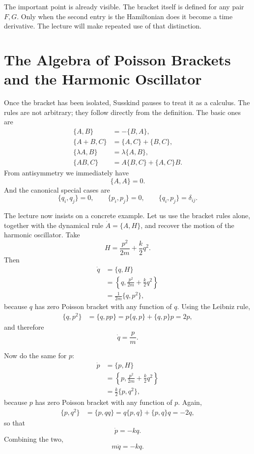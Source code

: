 The important point is already visible. The bracket itself is defined for any pair \(F,G\). Only when the second entry is the Hamiltonian does it become a time derivative. The lecture will make repeated use of that distinction.

\section{The Algebra of Poisson Brackets and the Harmonic Oscillator}

Once the bracket has been isolated, Susskind pauses to treat it as a calculus. The rules are not arbitrary; they follow directly from the definition. The basic ones are
\begin{align}
\{A,B\}&=-\{B,A\},\\
\{A+B,C\}&=\{A,C\}+\{B,C\},\\
\{\lambda A,B\}&=\lambda\{A,B\},\\
\{AB,C\}&=A\{B,C\}+\{A,C\}B.
\end{align}
From antisymmetry we immediately have
\begin{equation}
\{A,A\}=0.
\end{equation}
And the canonical special cases are
\begin{equation}
\{q_i,q_j\}=0,\qquad \{p_i,p_j\}=0,\qquad \{q_i,p_j\}=\delta_{ij}.
\end{equation}

The lecture now insists on a concrete example. Let us use the bracket rules alone, together with the dynamical rule \(\dot A=\{A,H\}\), and recover the motion of the harmonic oscillator. Take
\begin{equation}
H=\frac{p^2}{2m}+\frac{k}{2}q^2.
\end{equation}
Then
\begin{align}
\dot q
&=\{q,H\}\\
&=\left\{q,\frac{p^2}{2m}+\frac{k}{2}q^2\right\}\\
&=\frac{1}{2m}\{q,p^2\},
\end{align}
because \(q\) has zero Poisson bracket with any function of \(q\). Using the Leibniz rule,
\begin{align}
\{q,p^2\}&=\{q,pp\}=p\{q,p\}+\{q,p\}p=2p,
\end{align}
and therefore
\begin{equation}
\dot q=\frac{p}{m}.
\end{equation}

Now do the same for \(p\):
\begin{align}
\dot p
&=\{p,H\}\\
&=\left\{p,\frac{p^2}{2m}+\frac{k}{2}q^2\right\}\\
&=\frac{k}{2}\{p,q^2\},
\end{align}
because \(p\) has zero Poisson bracket with any function of \(p\). Again,
\begin{align}
\{p,q^2\}&=\{p,qq\}=q\{p,q\}+\{p,q\}q=-2q,
\end{align}
so that
\begin{equation}
\dot p=-kq.
\end{equation}
Combining the two,
\begin{equation}
m\ddot q=-kq.
\end{equation}

